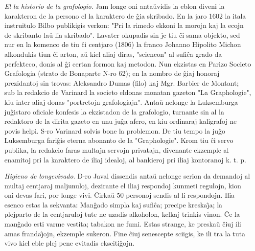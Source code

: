 \emph{El la historio de la grafologio}. Jam longe oni anta\u uvidis
la eblon diveni la karakteron de la persono el la karaktero de \^gia
skribado. En la jaro 1602 la itala instruitulo Bilbo publikigis
verkon: "Pri la rimedo ekkoni la morojn kaj la ecojn de skribanto
la\u u lia skribado". Lavater okupadis sin je tiu \^ci sama
objekto, sed nur en la komenco de tiu \^ci centjaro (1806) la franco
Johanno Hipolito Michon alkondukis tiun \^ci arton, a\u u kiel aliaj
diras, "sciencon" al sufi\^ca grado da perfekteco, donis al \^gi
certan formon kaj metodon. Nun ekzistas en Parizo Societo Grafologia
(strato de Bonaparte N-ro 62); en la nombro de \^giaj honoraj
prezidantoj sin trovas: Aleksandro Dumas (filo) kaj Mgr. Barbier de
Montant; sub la redakcio de Varinard la societo eldonas monatan
gazeton "La Graphologie", kiu inter aliaj donas "portretojn
grafologiajn". Anta\u u nelonge la Luksemburga ju\^gistaro oficiale
konfesis la ekzistadon de la grafologio, turnante sin al la
redaktoro de la dirita gazeto en unu ju\^ga afero, en kiu ordinaraj
kaligrafoj ne povis helpi. S-ro Varinard solvis bone la problemon.
De tiu tempo la ju\^go Luksemburga fari\^gis eterna abonanto de la
"Graphologie". Krom tiu \^ci servo publika, la redakcio faras
multajn servojn privatajn, divenante ekzemple al enamitoj pri la
karaktero de iliaj idealoj, al bankieroj pri iliaj kontoranoj k. t.
p.

\emph{Higieno de longevivado}. D-ro Javal dissendis anta\u u nelonge
serion da demandoj al multaj centjaraj maljunuloj, dezirante el
iliaj respondoj kunmeti regulojn, kion oni devas fari, por longe
vivi. \^Cirka\u u 50 personoj sendis al li respondojn. Ilia esenco
estas la sekvanta: Man\^gado simpla kaj sufi\^ca; precipe
kreska\^{\j}a; la plejparto de la centjaruloj tute ne uzadis
alkoholon, kelkaj trinkis vinon. \^Ce la man\^gado esti varme
vestita; tabakon ne fumi. Estas strange, ke preska\u u \^ciuj ili
amas franda\^{\j}ojn, ekzemple sukeron. Fine \^ciuj senescepte
sciigis, ke ili tra la tuta vivo kiel eble plej pene evitadis
eksciti\^gojn.

